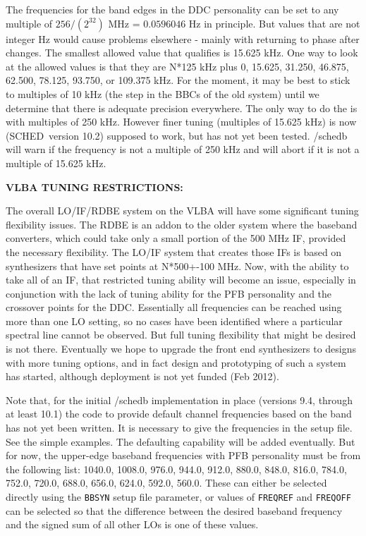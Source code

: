 \documentclass{report}
\newcommand{\schedb}{{\sc SCHED~}}
\begin{document}
The frequencies for the band edges in the DDC personality can be set
to any multiple of $256 / (2^{32})$ MHz = $0.0596046$ Hz in principle.
But values that are not integer Hz would cause problems elsewhere -
mainly with returning to phase after changes.  The smallest allowed
value that qualifies is 15.625 kHz.  One way to look at the allowed
values is that they are N*125 kHz plus 0, 15.625, 31.250, 46.875,
62.500, 78.125, 93.750, or 109.375 kHz.  For the moment, it may be
best to stick to multiples of 10 kHz (the step in the BBCs of the old
system) until we determine that there is adequate precision
everywhere.  The only way to do the is with multiples of 250 kHz.
However finer tuning (multiples of 15.625 kHz) is now (\schedb version
10.2) supposed to work, but has not yet been tested.  /schedb will 
warn if the frequency is not a multiple of 250 kHz and will abort if
it is not a multiple of 15.625 kHz.

{\bf VLBA TUNING RESTRICTIONS:}

The overall LO/IF/RDBE system on the VLBA will have some significant
tuning flexibility issues.  The RDBE is an addon to the older system
where the baseband converters, which could take only a small portion
of the 500 MHz IF, provided the necessary flexibility.  The LO/IF
system that creates those IFs is based on synthesizers that have
set points at N*500+-100 MHz.  Now, with the ability to take all of
an IF, that restricted tuning ability will become an issue, especially
in conjunction with the lack of tuning ability for the PFB personality
and the crossover points for the DDC.  Essentially all frequencies
can be reached using more than one LO setting, so no cases have been
identified where a particular spectral line cannot be observed.  But
full tuning flexibility that might be desired is not there.  Eventually
we hope to upgrade the front end synthesizers to designs with more
tuning options, and in fact design and prototyping of such a system
has started, although deployment is not yet funded (Feb 2012).

Note that, for the initial /schedb implementation in place (versions
9.4, through at least 10.1) the code to provide default channel
frequencies based on the band has not yet been written.  It is
necessary to give the frequencies in the setup file.  See the simple
examples.  The defaulting capability will be added eventually.  But
for now, the upper-edge baseband frequencies with PFB personality must
be from the following list: 1040.0, 1008.0, 976.0, 944.0, 912.0,
880.0, 848.0, 816.0, 784.0, 752.0, 720.0, 688.0, 656.0, 624.0, 592.0,
560.0.  These can either be selected directly using the {\tt BBSYN}
setup file parameter, or values of {\tt FREQREF} and {\tt FREQOFF}
can be selected so that the difference between the desired baseband
frequency and the signed sum of all other LOs is one of these values.
\end{document}
